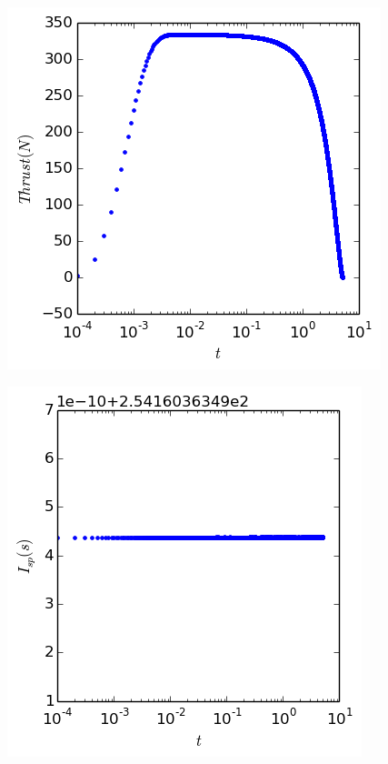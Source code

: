 \documentclass[cleanfoot,cleanhead,twocolumn,10pt,notitlepage]{asme2e}
\begin{document}
\includegraphics[width=\linewidth]{../python_stuff/Part2/Thrust.png}

\includegraphics[width=\linewidth]{../python_stuff/Part2/Isp.png}
\end{document}
